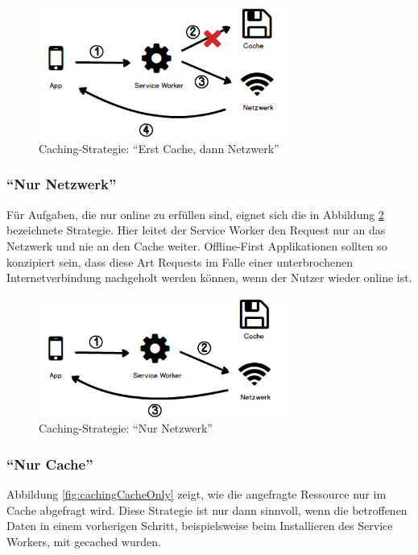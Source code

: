 \documentclass[a4paper, 12pt]{scrreprt}
\begin{document}
\begin{figure}[H]
	\centering
	\includegraphics[width=0.75\textwidth]{cachefirst.png}
	\caption{Caching-Strategie: \enquote{Erst Cache, dann Netzwerk}}
	\label{fig:cachingCacheFirst}
\end{figure}

\subsubsection{\enquote{Nur Netzwerk}}
Für Aufgaben, die nur online zu erfüllen sind, eignet sich die in Abbildung \ref{fig:cachingNetworkOnly} bezeichnete Strategie. Hier leitet der Service Worker den Request nur an das Netzwerk und nie an den Cache weiter. Offline-First Applikationen sollten so konzipiert sein, dass diese Art Requests im Falle einer unterbrochenen Internetverbindung nachgeholt werden können, wenn der Nutzer wieder online ist.

\begin{figure}[H]
	\centering
	\includegraphics[width=0.75\textwidth]{networkonly.png}
	\caption{Caching-Strategie: \enquote{Nur Netzwerk}}
	\label{fig:cachingNetworkOnly}
\end{figure}

\subsubsection{\enquote{Nur Cache}}
Abbildung \ref{fig:cachingCacheOnly} zeigt, wie die angefragte Ressource nur im Cache abgefragt wird. Diese Strategie ist nur dann sinnvoll, wenn die betroffenen Daten in einem vorherigen Schritt, beispielsweise beim Installieren des Service Workers, mit gecached wurden.
\end{document}
